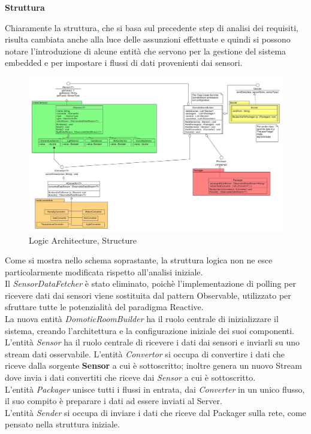 \afterpage{\clearpage}

\newpage

\begin{center}
  \textbf{Struttura}
\end{center}

Chiaramente la struttura, che si basa sul precedente step di analisi dei requisiti, risulta cambiata anche alla luce delle assunzioni effettuate e quindi si possono notare l'introduzione di alcune entit\`a che servono per la gestione del sistema embedded e per impostare i flussi di dati provenienti dai sensori.

\begin{figure}[h]
\centering
\includegraphics[scale=0.2]{Figures/LogicArchitecture/EmbeddedSystem/Structure}
\caption{Logic Architecture, Structure}
\end{figure}

Come si mostra nello schema soprastante, la struttura logica non ne esce particolarmente modificata rispetto all'analisi iniziale.\\
Il \textit{SensorDataFetcher} è stato eliminato, poich\`e l'implementazione di polling per ricevere dati dai sensori viene sostituita dal pattern Observable, utilizzato per sfruttare tutte le potenzialità del paradigma Reactive. \\
La nuova entit\`a \textit{DomoticRoomBuilder} ha il ruolo centrale di inizializzare il sistema, creando l'architettura e la configurazione iniziale dei suoi componenti.\\
L'entit\`a \textit{Sensor} ha il ruolo centrale di ricevere i dati dai sensori e inviarli su uno stream dati osservabile.
L'entit\`a \textit{Convertor} si occupa di convertire i dati che riceve dalla sorgente \textbf{Sensor} a cui è sottoscritto; inoltre genera un nuovo Stream dove invia i dati convertiti che riceve dai \textit{Sensor} a cui è sottoscritto.\\
L'entit\`a \textit{Packager} unisce tutti i flussi in entrata, dai \textit{Converter} in un unico flusso, il suo compito è preparare i dati ad essere inviati al Server.\\
L'entit\`a \textit{Sender} si occupa di inviare i dati che riceve dal Packager sulla rete, come pensato nella struttura iniziale.

